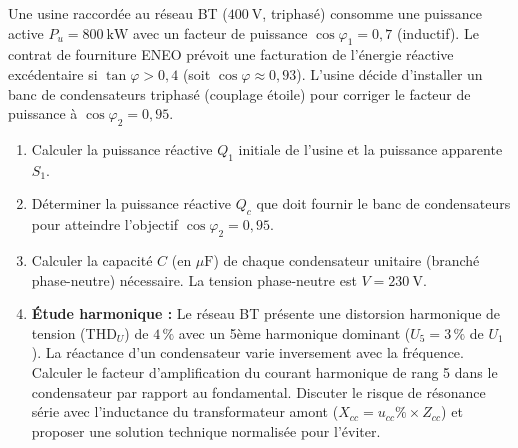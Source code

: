 \documentclass[11pt]{article}
\begin{document}
\begin{exercice}
Une usine raccordée au réseau BT ($\SI{400}{\volt}$, triphasé) consomme une puissance active $P_u = \SI{800}{\kilo\watt}$ avec un facteur de puissance $\cos\varphi_1 = 0,7$ (inductif). Le contrat de fourniture ENEO prévoit une facturation de l'énergie réactive excédentaire si $\tan\varphi > 0,4$ (soit $\cos\varphi \approx 0,93$). L'usine décide d'installer un banc de condensateurs triphasé (couplage étoile) pour corriger le facteur de puissance à $\cos\varphi_2 = 0,95$.
\begin{enumerate}
    \item Calculer la puissance réactive $Q_1$ initiale de l'usine et la puissance apparente $S_1$.
    \item Déterminer la puissance réactive $Q_c$ que doit fournir le banc de condensateurs pour atteindre l'objectif $\cos\varphi_2 = 0,95$.
    \item Calculer la capacité $C$ (en $\mu\text{F}$) de chaque condensateur unitaire (branché phase-neutre) nécessaire. La tension phase-neutre est $V = \SI{230}{\volt}$.
    \item \textbf{Étude harmonique :} Le réseau BT présente une distorsion harmonique de tension (THD$_U$) de $4\,\%$ avec un 5ème harmonique dominant ($U_5 = 3\,\%$ de $U_1$). La réactance d'un condensateur varie inversement avec la fréquence. Calculer le facteur d'amplification du courant harmonique de rang 5 dans le condensateur par rapport au fondamental. Discuter le risque de résonance série avec l'inductance du transformateur amont ($X_{cc} = u_{cc}\% \times Z_{cc}$) et proposer une solution technique normalisée pour l'éviter.
\end{enumerate}
\end{exercice}
\end{document}
